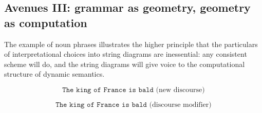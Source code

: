 \subsection{Avenues III: grammar as geometry, geometry as computation}

The example of noun phrases illustrates the higher principle that the particulars of interpretational choices into string diagrams are inessential: any consistent scheme will do, and the string diagrams will give voice to the computational structure of dynamic semantics.

\begin{example}
\[\texttt{The king of France is bald} \text{ (new discourse)}\]
\end{example}

\begin{example}
\[\texttt{The king of France is bald} \text{ (discourse modifier)}\]
\end{example}


\clearpage